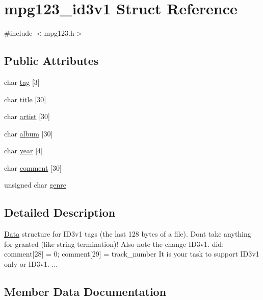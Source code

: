 \hypertarget{structmpg123__id3v1}{}\section{mpg123\+\_\+id3v1 Struct Reference}
\label{structmpg123__id3v1}


{\ttfamily \#include $<$mpg123.\+h$>$}

\subsection*{Public Attributes}
\begin{DoxyCompactItemize}
\item 
char \hyperlink{structmpg123__id3v1_a85b70827df0ba68d51e303c009542a42}{tag} \mbox{[}3\mbox{]}
\item 
char \hyperlink{structmpg123__id3v1_a05467ad1a975719b36b12070fbc9af84}{title} \mbox{[}30\mbox{]}
\item 
char \hyperlink{structmpg123__id3v1_a35caeda87de37e14e61034d66997df90}{artist} \mbox{[}30\mbox{]}
\item 
char \hyperlink{structmpg123__id3v1_a45bcaa4c01abd744bb65bd2c2854fa3c}{album} \mbox{[}30\mbox{]}
\item 
char \hyperlink{structmpg123__id3v1_ababecdc1c885ece95a0e397ebdddcad7}{year} \mbox{[}4\mbox{]}
\item 
char \hyperlink{structmpg123__id3v1_ab366a41d665bd730d0276c27f173c5af}{comment} \mbox{[}30\mbox{]}
\item 
unsigned char \hyperlink{structmpg123__id3v1_ac7fa19ffcdc1fbb8d5fbf786606baa08}{genre}
\end{DoxyCompactItemize}


\subsection{Detailed Description}
\hyperlink{classData}{Data} structure for I\+D3v1 tags (the last 128 bytes of a file). Don\textquotesingle{}t take anything for granted (like string termination)! Also note the change I\+D3v1. did\+: comment\mbox{[}28\mbox{]} = 0; comment\mbox{[}29\mbox{]} = track\+\_\+number It is your task to support I\+D3v1 only or I\+D3v1. ... 

\subsection{Member Data Documentation}
\mbox{\label{structmpg123__id3v1_a45bcaa4c01abd744bb65bd2c2854fa3c}} 
